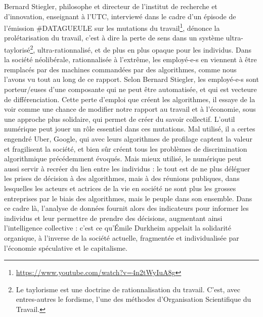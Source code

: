 \documentclass[a4paper,12pt]{report}
\begin{document}
Bernard Stiegler, philosophe et directeur de l'institut de recherche et d'innovation, enseignant à l'UTC, interviewé dans le cadre d'un épisode de l'émission \#DATAGUEULE sur les mutations du travail\footnote{\url{https://www.youtube.com/watch?v=4n2tWyIuA8g}}, dénonce la prolétarisation du travail, c'est à dire la perte de sens dans un système ultra-taylorisé\footnote{Le taylorisme est une doctrine de rationnalisation du travail. C'est, avec entres-autres le fordisme, l'une des méthodes d'Organisation Scientifique du Travail.}, ultra-rationnalisé, et  de plus en plus opaque pour les individus. Dans la société néolibérale, rationnalisée à l'extrême, les employé-e-s en viennent à être remplacés par des machines commandées par des algorithmes, comme nous l'avons vu tout au long de ce rapport. Selon Bernard Stiegler, les employé-e-s sont porteur/euses d'une composante qui ne peut être automatisée, et qui est vecteure de différenciation. Cette perte d'emploi que créent les algorithmes, il essaye de la voir comme une chance de modifier notre rapport au travail et à l'économie, sous une approche plus solidaire, qui permet de créer du savoir collectif. L'outil numérique peut jouer un rôle essentiel dans ces mutations. Mal utilisé, il a certes engendré Uber, Google, qui avec leurs algorithmes de profilage captent la valeur et fragilisent la société, et bien sûr créent tous les problèmes de discrimination algorithmique précédemment évoqués. Mais mieux utilisé, le numérique peut aussi servir à recréer du lien entre les individus : le tout est de ne plus déléguer les prises de décision à des algorithmes, mais à des réunions publiques, dans lesquelles les acteurs et actrices de la vie en société ne sont plus les grosses entreprises par le biais des algorithmes, mais le peuple dans son ensemble. Dans ce cadre là, l'analyse de données fournit alors des indicateurs pour informer les individus et leur permettre de prendre des décisions, augmentant ainsi l'intelligence collective : c'est ce qu'Émile Durkheim appelait la solidarité organique, à l'inverse de la société actuelle, fragmentée et individualisée par l'économie spéculative et le capitalisme.
\end{document}
